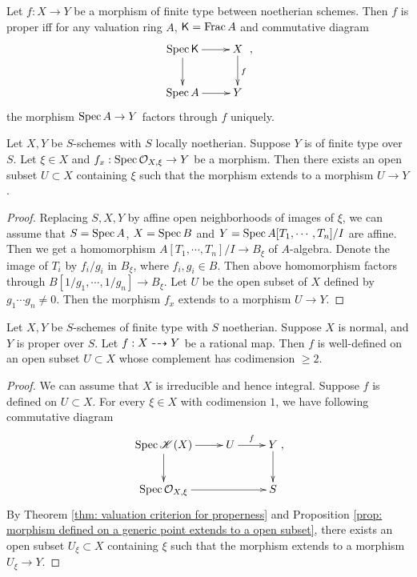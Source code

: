     \begin{theorem}\label{thm: valuation criterion for properness}
        Let $f:X \to Y$ be a morphism of finite type between noetherian schemes.
        Then $f$ is proper iff for any valuation ring $A$, ${\mathsf{K}} = \operatorname{Frac} A$ and commutative diagram
        \[ \xymatrix{
            \Spec \KK \ar[r] \ar[d] & X \ar[d]^f \\
            \Spec A \ar[r] & Y
        }, \]
        the morphism $\operatorname{Spec} A \to Y$ factors through $f$ uniquely.
    \end{theorem}

    \begin{proposition}\label{prop: morphism defined on a generic point extends to a open subset}
        Let $X,Y$ be $S$-schemes with $S$ locally noetherian.
        Suppose $Y$ is of finite type over $S$.
        Let $\xi \in X$ and $f_x: \operatorname{Spec} {\mathcal{O}}_{X,\xi} \to Y$ be a morphism.
        Then there exists an open subset $U \subset X$ containing $\xi$ such that the morphism extends to a morphism $U \to Y$.
    \end{proposition}
    \begin{proof}
        Replacing $S,X,Y$ by affine open neighborhoods of images of $\xi$, we can assume that $S = \operatorname{Spec} A$, $X=\operatorname{Spec} B$ and $Y = \operatorname{Spec} A[T_1,\cdots,T_n]/I$ are affine.
        Then we get a homomorphism $A[T_1,\cdots,T_n]/I \to B_{\xi}$ of $A$-algebra.
        Denote the image of $T_i$ by $f_i/g_i$ in $B_{\xi}$, where $f_i,g_i \in B$.
        Then above homomorphism factors through $B[1/g_1,\cdots,1/g_n] \to B_{\xi}$.
        Let $U$ be the open subset of $X$ defined by $g_1\cdots g_n \neq 0$.
        Then the morphism $f_x$ extends to a morphism $U \to Y$.
    \end{proof}

    \begin{theorem}\label{thm: extension of morphism form normal to proper}
        Let $X,Y$ be $S$-schemes of finite type with $S$ noetherian.
        Suppose $X$ is normal, and $Y$ is proper over $S$.
        Let $f:X \dasharrow Y$ be a rational map.
        Then $f$ is well-defined on an open subset $U \subset X$ whose complement has codimension $\geq 2$.
    \end{theorem}
    \begin{proof}
        We can assume that $X$ is irreducible and hence integral.
        Suppose $f$ is defined on $U \subset X$.
        For every $\xi \in X$ with codimension $1$, we have following commutative diagram
        \[ \xymatrix{
            \Spec \fkk(X) \ar[r] \ar[d] & U \ar[r]^f & Y \ar[d] \\
            \Spec \calo_{X,\xi} \ar[rr] & & S
        }, \]
        By Theorem \ref{thm: valuation criterion for properness} and Proposition \ref{prop: morphism defined on a generic point extends to a open subset}, there exists an open subset $U_\xi \subset X$ containing $\xi$ such that the morphism extends to a morphism $U_\xi \to Y$.

    \end{proof}

